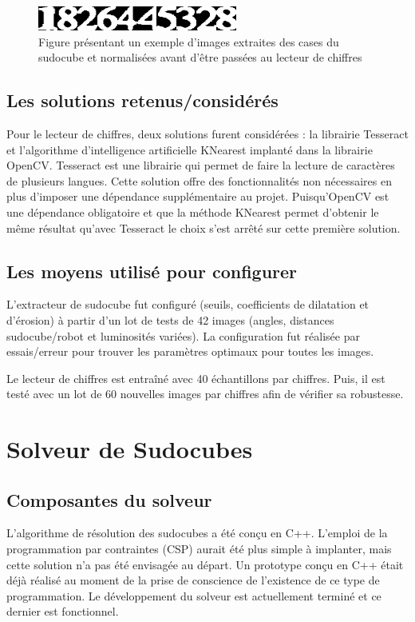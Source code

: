 \begin{figure}[htbp]
\centering
\includegraphics[scale=0.9]{fig/chiffresLues.png}
\caption{Figure présentant un exemple d'images extraites des cases du sudocube et normalisées avant d'être passées au lecteur de chiffres}
\label{fig:chifLu}
\end{figure}

\subsection{Les solutions retenus/considérés}
Pour le lecteur de chiffres, deux solutions furent considérées : la librairie Tesseract et l'algorithme d'intelligence artificielle KNearest implanté dans la librairie OpenCV. Tesseract est une librairie qui permet de faire la lecture de caractères de plusieurs langues. Cette solution offre des fonctionnalités non nécessaires en plus d'imposer une dépendance supplémentaire au projet. Puisqu’OpenCV est une dépendance obligatoire et que la méthode KNearest permet d'obtenir le même résultat qu'avec Tesseract le choix s'est arrêté sur cette première solution.

\subsection{Les moyens utilisé pour configurer}
L'extracteur de sudocube fut configuré (seuils, coefficients de dilatation et d'érosion) à partir d'un lot de tests de 42 images (angles, distances sudocube/robot et luminosités variées). La configuration fut réalisée par essais/erreur pour trouver les paramètres optimaux pour toutes les images.

Le lecteur de chiffres est entraîné avec 40 échantillons par chiffres. Puis, il est testé avec un lot de 60 nouvelles images par chiffres afin de vérifier sa robustesse.

\section{Solveur de Sudocubes}

\subsection{Composantes du solveur}
L'algorithme de résolution des sudocubes a été conçu en C++. L'emploi de la programmation par contraintes (CSP) aurait été  plus simple à implanter, mais cette solution n'a pas été envisagée au départ. Un prototype conçu en C++ était déjà réalisé au moment de la prise de conscience de l'existence de ce type de programmation. Le développement du solveur est actuellement terminé et ce dernier est fonctionnel.


